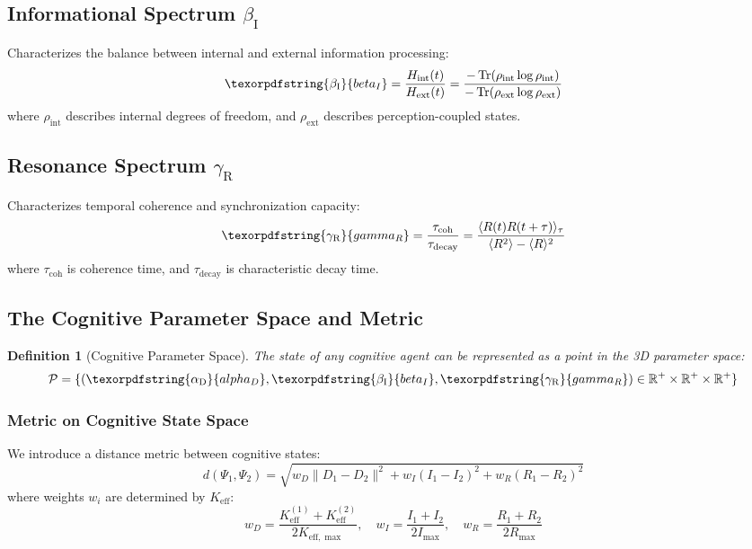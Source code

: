 \documentclass[12pt,a4paper]{article}
\newtheorem{definition}{Definition}
\DeclareMathOperator{\Tr}{Tr}
\DeclareRobustCommand{\alD}{\texorpdfstring{\ensuremath{\alpha_{\mathrm{D}}}}{alpha_D}}
\DeclareRobustCommand{\beI}{\texorpdfstring{\ensuremath{\beta_{\mathrm{I}}}}{beta_I}}
\DeclareRobustCommand{\gaR}{\texorpdfstring{\ensuremath{\gamma_{\mathrm{R}}}}{gamma_R}}
\newcommand{\Ke}{K_{\mathrm{eff}}}
\newcommand{\Kemax}{K_{\mathrm{eff},\max}}
\begin{document}
	\subsection{Informational Spectrum \beI}
	
	Characterizes the balance between internal and external information processing:
	\begin{equation}
		\label{eq:betaI}
		\beI = \frac{H_{\mathrm{int}}(t)}{H_{\mathrm{ext}}(t)} = \frac{-\Tr(\rho_{\mathrm{int}}\log\rho_{\mathrm{int}})}{-\Tr(\rho_{\mathrm{ext}}\log\rho_{\mathrm{ext}})}
	\end{equation}
	where \(\rho_{\mathrm{int}}\) describes internal degrees of freedom, and \(\rho_{\mathrm{ext}}\) describes perception-coupled states.
	
	\subsection{Resonance Spectrum \gaR}
	
	Characterizes temporal coherence and synchronization capacity:
	\begin{equation}
		\label{eq:gammaR}
		\gaR = \frac{\tau_{\mathrm{coh}}}{\tau_{\mathrm{decay}}} = \frac{\langle R(t)R(t+\tau)\rangle_\tau}{\langle R^2\rangle - \langle R\rangle^2}
	\end{equation}
	where \(\tau_{\mathrm{coh}}\) is coherence time, and \(\tau_{\mathrm{decay}}\) is characteristic decay time.
	
	\subsection{The Cognitive Parameter Space and Metric}
	
	\begin{definition}[Cognitive Parameter Space]
		The state of any cognitive agent can be represented as a point in the 3D parameter space:
		\[
		\mathcal{P} = \{(\alD, \beI, \gaR) \in \mathbb{R}^+ \times \mathbb{R}^+ \times \mathbb{R}^+\}
		\]
	\end{definition}
	
	\subsubsection{Metric on Cognitive State Space}
	We introduce a distance metric between cognitive states:
	\[
	d(\Psi_1, \Psi_2) = \sqrt{w_D \|D_1 - D_2\|^2 + w_I (I_1 - I_2)^2 + w_R (R_1 - R_2)^2}
	\]
	where weights \(w_i\) are determined by \(\Ke\):
	\[
	w_D = \frac{\Ke^{(1)} + \Ke^{(2)}}{2\Kemax}, \quad w_I = \frac{I_1 + I_2}{2I_{\max}}, \quad w_R = \frac{R_1 + R_2}{2R_{\max}}
	\]
	
\end{document}
